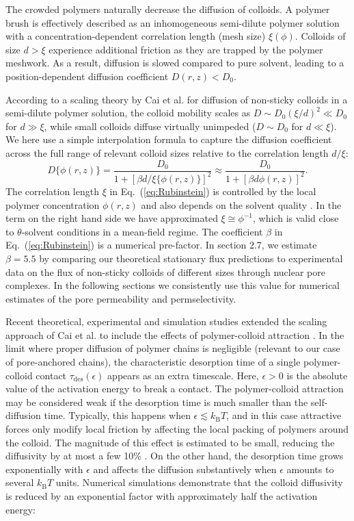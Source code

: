 \documentclass[12pt, a4paper]{article}
\begin{document}
The crowded polymers naturally decrease the diffusion of colloids.
A polymer brush is effectively described as an inhomogeneous semi-dilute polymer solution with a concentration-dependent correlation length (mesh size) $\xi(\phi)$.
Colloids of size $d > \xi$ experience additional friction as they are trapped by the polymer meshwork.
As a result, diffusion is slowed compared to pure solvent, leading to a position-dependent diffusion coefficient $D(r,z) < D_0$.

According to a scaling theory by Cai et al. \cite{Cai2011} for diffusion of non-sticky colloids in a semi-dilute polymer solution, the colloid mobility scales as $D\sim D_0 (\xi/d)^2\ll D_0$ for $d\gg \xi$, while small colloids diffuse virtually unimpeded ($D\sim D_0$ for $d\ll \xi$). We here use a simple interpolation formula to capture the diffusion coefficient across the full range of relevant colloid sizes relative to the correlation length $d / \xi$:
\begin{equation}
    D\{\phi(r,z)\} = \frac{D_0}{1+[\beta d / \xi\{\phi(r,z)\}]^2} \approx \frac{D_0}{1+[\beta d \phi(r,z)]^2} .
    \label{eq:Rubinstein}
\end{equation}
The correlation length $\xi$ in Eq.~(\ref{eq:Rubinstein}) is controlled by the local polymer concentration $\phi(r,z)$ and also depends on the solvent quality \cite{DeGennes1979}.
In the term on the right hand side we have approximated $\xi \cong \phi^{-1}$, which is valid close to $\theta$-solvent conditions in a mean-field regime.
The coefficient $\beta$ in Eq.~(\ref{eq:Rubinstein}) is a numerical pre-factor.
In section 2.7, we estimate $\beta = 5.5$ by comparing our theoretical stationary flux predictions to experimental data on the flux of non-sticky colloids of different sizes through nuclear pore complexes.
In the following sections we consistently use this value for numerical estimates of the pore permeability and permselectivity.  

Recent theoretical, experimental and simulation studies extended the scaling approach of Cai et al. \cite{Cai2011} to include the effects of polymer-colloid attraction \cite{Yamamoto2018, Carroll2018}.
In the limit where proper diffusion of polymer chains is negligible (relevant to our case of pore-anchored chains), the characteristic desorption time of a single polymer-colloid contact $\tau_\text{des}(\epsilon)$ appears as an extra timescale.
Here, $\epsilon > 0$ is the absolute value of the activation energy to break a contact.
The polymer-colloid attraction may be considered weak if the desorption time is much smaller than the self-diffusion time.
Typically, this happens when $\epsilon \lesssim k_\text{B} T$, and in this case attractive forces only modify local friction by affecting the local packing of polymers around the colloid.
The magnitude of this effect is estimated to be small, reducing the diffusivity by at most a few 10\% \cite{Yamamoto2011}.
On the other hand, the desorption time grows exponentially with $\epsilon$ and affects the diffusion substantively when $\epsilon$ amounts to several $k_\text{B} T$ units.
Numerical simulations \cite{Yamamoto2018} demonstrate that the colloid diffusivity is reduced by an exponential factor with approximately half the activation energy:
\end{document}
